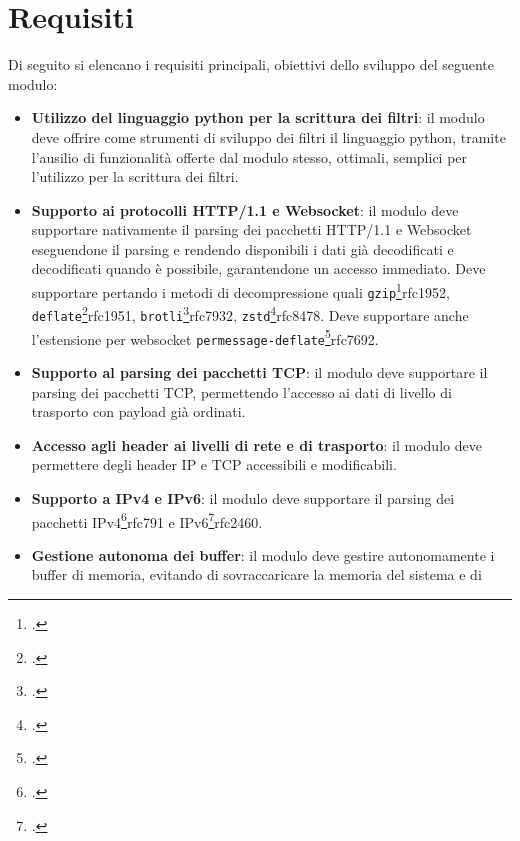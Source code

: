 \section{Requisiti}

Di seguito si elencano i requisiti principali, obiettivi dello sviluppo del seguente modulo:

\begin{itemize}
    \setlength{\itemsep}{2pt}
    \setlength{\parskip}{2pt}
    \item \textbf{Utilizzo del linguaggio python per la scrittura dei filtri}: il modulo deve offrire come strumenti di sviluppo dei filtri
    il linguaggio python, tramite l'ausilio di funzionalità offerte dal modulo stesso, ottimali, semplici per l'utilizzo per la scrittura dei filtri.
    \item \textbf{Supporto ai protocolli HTTP/1.1 e Websocket}: il modulo deve supportare nativamente il parsing dei pacchetti HTTP/1.1 e Websocket eseguendone il parsing
    e rendendo disponibili i dati già decodificati e decodificati quando è possibile, garantendone un accesso immediato. Deve supportare pertando i metodi di decompressione
    quali \texttt{gzip}\footcite{RFC1952, GZIP file format specification version 4.3}{rfc1952},
    \texttt{deflate}\footcite{RFC1951, DEFLATE Compressed Data Format Specification version 1.3}{rfc1951},
    \texttt{brotli}\footcite{RFC7932, Brotli Compressed Data Format}{rfc7932},
    \texttt{zstd}\footcite{RFC8478, Zstandard Compression and the application/zstd Media Type}{rfc8478}.
    Deve supportare anche l'estensione per websocket \texttt{permessage-deflate}\footcite{RFC7692, Compression Extensions for WebSocket}{rfc7692}.
    \item \textbf{Supporto al parsing dei pacchetti TCP}: il modulo deve supportare il parsing dei pacchetti TCP, permettendo l'accesso ai dati di livello di trasporto con payload già ordinati.
    \item \textbf{Accesso agli header ai livelli di rete e di trasporto}: il modulo deve permettere degli header IP e TCP accessibili e modificabili.
    \item \textbf{Supporto a IPv4 e IPv6}: il modulo deve supportare il parsing dei pacchetti IPv4\footcite{RFC791, Internet Protocol}{rfc791} e IPv6\footcite{RFC2460, Internet Protocol, Version 6 (IPv6) Specification}{rfc2460}.
    \item \textbf{Gestione autonoma dei buffer}: il modulo deve gestire autonomamente i buffer di memoria, evitando di sovraccaricare la memoria del sistema e di

\end{itemize}

